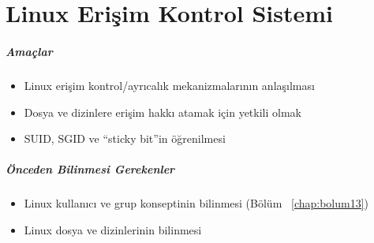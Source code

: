 \chapter{Linux Erişim Kontrol Sistemi}
\label{chap:bolum14}
\paragraph{Amaçlar}{
\begin{itemize}
 \item Linux erişim kontrol/ayrıcalık mekanizmalarının anlaşılması
 \item Dosya ve dizinlere erişim hakkı atamak için yetkili olmak
 \item SUID, SGID ve “sticky bit”in öğrenilmesi
 \end{itemize}}
\paragraph{Önceden Bilinmesi Gerekenler}
\begin{itemize}
 \item Linux kullanıcı ve grup konseptinin bilinmesi (Bölüm ~\ref{chap:bolum13})
 \item Linux dosya ve dizinlerinin bilinmesi
 \end{itemize}

